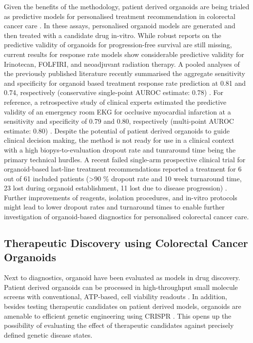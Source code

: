 \begin{flushleft}
Given the benefits of the methodology, patient derived organoids are being trialed as predictive models for personalised treatment recommendation in colorectal cancer care \cite{VanDeWetering2015, Vlachogiannis2018, ganeshRectalCancerOrganoid2019a, ooftPatientderivedOrganoidsCan2019a, yaoPatientDerivedOrganoidsPredict2020a}. In these assays, personalised organoid models are generated and then treated with a candidate drug in-vitro. While robust reports on the predictive validity of organoids for progression-free survival are still missing, current results for response rate models show considerable predictive validity for Irinotecan, FOLFIRI, and neoadjuvant radiation therapy. A pooled analyses of the previously published literature recently summarised the aggregate sensitivity and specificity for organoid based treatment response rate prediction at 0.81 and 0.74, respectively (conservative single-point AUROC estimate: 0.78) \cite{wensinkPatientderivedOrganoidsPredictive2021, zhangNoteROCAnalysis2005}. For reference, a retrospective study of clinical experts estimated the predictive validity of an emergency room EKG for occlusive myocardial infarction at a sensitivity and specificity of 0.79 and 0.80, respectively (multi-point AUROC estimate: 0.80) \cite{al-zaitiMachineLearningECG2023}. Despite the potential of patient derived organoids to guide clinical decision making, the method is not ready for use in a clinical context with a high biopys-to-evaluation dropout rate and tunraround time being the primary technical hurdles. A recent failed single-arm prospective clinical trial for organoid-based last-line treatment recommendations reported a treatment for 6 out of 61 included patients (>90 \% dropout rate and 10 week turnaround time, 23 lost during organoid establishment, 11 lost due to disease progression) \cite{ooftProspectiveExperimentalTreatment2021}. Further improvements of reagents, isolation procedures, and in-vitro protocols might lead to lower dropout rates and turnaround times to enable further investigation of organoid-based diagnostics for personalised colorectal cancer care. \par

\subsection{Therapeutic Discovery using Colorectal Cancer Organoids}

Next to diagnostics, organoid have been evaluated as models in drug discovery. Patient derived organoids can be processed in high-throughput small molecule screens with conventional, ATP-based, cell viability readouts \cite{VanDeWetering2015}. In addition, besides testing therapeutic candidates on patient derived models, organoids are amenable to efficient genetic engineering using CRISPR \cite{Matano2015-zw, Drost2017-fu}. This opens up the possibility of evaluating the effect of therapeutic candidates against precisely defined genetic disease states.


\end{flushleft}
